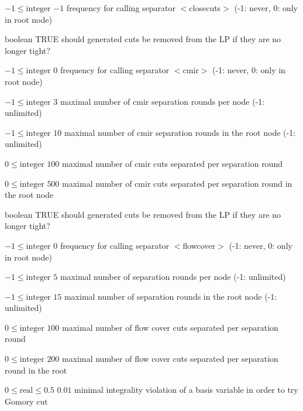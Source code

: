 %
{$-1\leq\textrm{integer}$}%
{$-1$}%
{frequency for calling separator $<$closecuts$>$ (-1: never, 0: only in root node)}%
{}

%
{boolean}%
{TRUE}%
{should generated cuts be removed from the LP if they are no longer tight?}%
{}

%
{$-1\leq\textrm{integer}$}%
{$0$}%
{frequency for calling separator $<$cmir$>$ (-1: never, 0: only in root node)}%
{}

%
{$-1\leq\textrm{integer}$}%
{$3$}%
{maximal number of cmir separation rounds per node (-1: unlimited)}%
{}

%
{$-1\leq\textrm{integer}$}%
{$10$}%
{maximal number of cmir separation rounds in the root node (-1: unlimited)}%
{}

%
{$0\leq\textrm{integer}$}%
{$100$}%
{maximal number of cmir cuts separated per separation round}%
{}

%
{$0\leq\textrm{integer}$}%
{$500$}%
{maximal number of cmir cuts separated per separation round in the root node}%
{}

%
{boolean}%
{TRUE}%
{should generated cuts be removed from the LP if they are no longer tight?}%
{}

%
{$-1\leq\textrm{integer}$}%
{$0$}%
{frequency for calling separator $<$flowcover$>$ (-1: never, 0: only in root node)}%
{}

%
{$-1\leq\textrm{integer}$}%
{$5$}%
{maximal number of separation rounds per node (-1: unlimited)}%
{}

%
{$-1\leq\textrm{integer}$}%
{$15$}%
{maximal number of separation rounds in the root node (-1: unlimited)}%
{}

%
{$0\leq\textrm{integer}$}%
{$100$}%
{maximal number of flow cover cuts separated per separation round}%
{}

%
{$0\leq\textrm{integer}$}%
{$200$}%
{maximal number of flow cover cuts separated per separation round in the root}%
{}

%
{$0\leq\textrm{real}\leq0.5$}%
{$0.01$}%
{minimal integrality violation of a basis variable in order to try Gomory cut}%
{}

